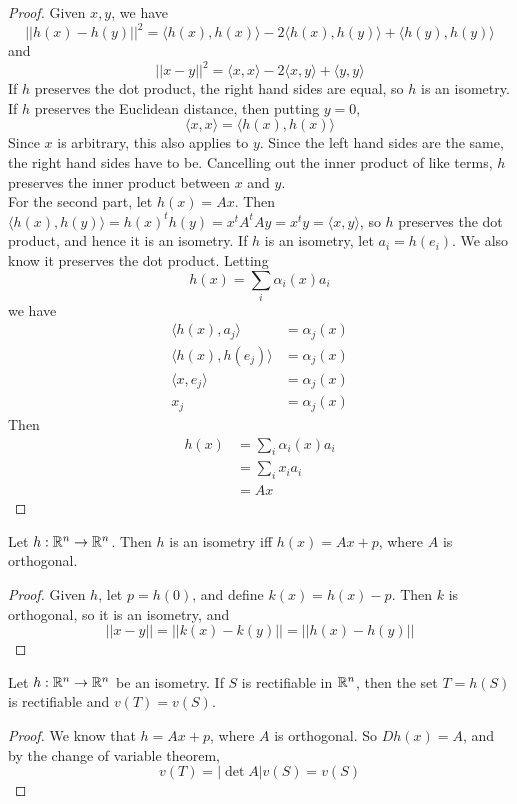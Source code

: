 \documentclass[12pt]{article}
\begin{document}
\begin{proof}
    Given $x, y$, we have
    $$||h(x) - h(y)||^2 = \langle h(x), h(x) \rangle - 2 \langle h(x), h(y) \rangle + \langle h(y), h(y) \rangle$$
    and
    $$||x - y||^2 = \langle x, x \rangle - 2 \langle x, y \rangle + \langle y, y\rangle$$
    If $h$ preserves the dot product, the right hand sides are equal, so $h$ is an isometry. If $h$ preserves the Euclidean distance, then putting $y = 0$,
    $$\langle x, x\rangle = \langle h(x), h(x)\rangle$$
    Since $x$ is arbitrary, this also applies to $y$. Since the left hand sides are the same, the right hand sides have to be. Cancelling out the inner product of like terms, $h$ preserves the inner product between $x$ and $y$. \\
    For the second part, let $h(x) = Ax$. Then $\langle h(x), h(y) \rangle = h(x)^th(y) = x^tA^tAy = x^ty = \langle x, y \rangle$, so $h$ preserves the dot product, and hence it is an isometry. If $h$ is an isometry, let $a_i = h(e_i)$. We also know it preserves the dot product. Letting
    $$h(x) = \sum_i \alpha_i(x) a_i$$
    we have
    \begin{align*}
        \langle h(x), a_j\rangle &= \alpha_j(x) \\
        \langle h(x), h(e_j)\rangle &= \alpha_j(x) \\
        \langle x, e_j\rangle &= \alpha_j(x) \\
        x_j &= \alpha_j(x)
    \end{align*}
    Then
    \begin{align*}
        h(x) &= \sum_i \alpha_i(x) a_i \\
             &= \sum_i x_i a_i \\
             &= Ax
    \end{align*}
\end{proof}

\begin{thm}
    Let $h: \mathbb{R}^n \rightarrow \mathbb{R}^n$. Then $h$ is an isometry iff $h(x) = Ax + p$, where $A$ is orthogonal.
\end{thm}

\begin{proof}
    Given $h$, let $p = h(0)$, and define $k(x) = h(x) - p$. Then $k$ is orthogonal, so it is an isometry, and
    $$||x - y|| = ||k(x) - k(y)|| = ||h(x) - h(y)||$$
\end{proof}

\begin{thm}
    Let $h: \mathbb{R}^n \rightarrow \mathbb{R}^n$ be an isometry. If $S$ is rectifiable in $\mathbb{R}^n$, then the set $T = h(S)$ is rectifiable and $v(T) = v(S)$.
\end{thm}

\begin{proof}
    We know that $h = Ax + p$, where $A$ is orthogonal. So $Dh(x) = A$, and by the change of variable theorem,
    $$v(T) = |\det A|v(S) = v(S)$$
\end{proof}
\end{document}
